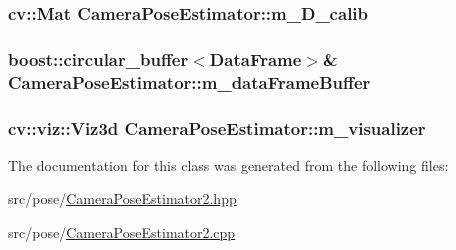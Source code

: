 \subsubsection[{\texorpdfstring{m\+\_\+\+D\+\_\+calib}{m_D_calib}}]{\setlength{\rightskip}{0pt plus 5cm}cv\+::\+Mat Camera\+Pose\+Estimator\+::m\+\_\+\+D\+\_\+calib\hspace{0.3cm}{\ttfamily [private]}}\hypertarget{classCameraPoseEstimator_a794f0ecbbbb73d92878c04c757adfe69}{}\label{classCameraPoseEstimator_a794f0ecbbbb73d92878c04c757adfe69}
\subsubsection[{\texorpdfstring{m\+\_\+data\+Frame\+Buffer}{m_dataFrameBuffer}}]{\setlength{\rightskip}{0pt plus 5cm}boost\+::circular\+\_\+buffer$<${\bf Data\+Frame}$>$\& Camera\+Pose\+Estimator\+::m\+\_\+data\+Frame\+Buffer\hspace{0.3cm}{\ttfamily [private]}}\hypertarget{classCameraPoseEstimator_aba5c3d97eb6188c08a7b0121c38d1f76}{}\label{classCameraPoseEstimator_aba5c3d97eb6188c08a7b0121c38d1f76}
\subsubsection[{\texorpdfstring{m\+\_\+visualizer}{m_visualizer}}]{\setlength{\rightskip}{0pt plus 5cm}cv\+::viz\+::\+Viz3d Camera\+Pose\+Estimator\+::m\+\_\+visualizer\hspace{0.3cm}{\ttfamily [private]}}\hypertarget{classCameraPoseEstimator_ac2465c62e9e4937183fd77e9788d9f8b}{}\label{classCameraPoseEstimator_ac2465c62e9e4937183fd77e9788d9f8b}


The documentation for this class was generated from the following files\+:\begin{DoxyCompactItemize}
\item 
src/pose/\hyperlink{CameraPoseEstimator2_8hpp}{Camera\+Pose\+Estimator2.\+hpp}\item 
src/pose/\hyperlink{CameraPoseEstimator2_8cpp}{Camera\+Pose\+Estimator2.\+cpp}\end{DoxyCompactItemize}
